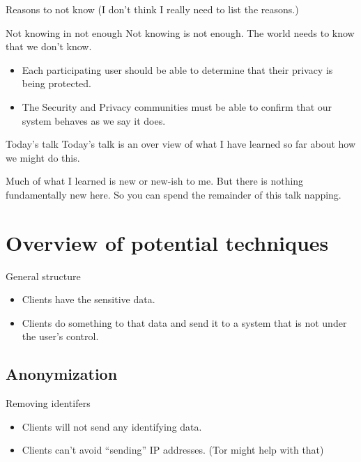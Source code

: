\documentclass[xcolor={dvipsnames,table,hyperref}]{beamer}
\begin{document}
\begin{frame}{Reasons to not know}
  (I don't think I really need to list the reasons.)
\end{frame}

\begin{frame}{Not knowing in not enough}
  Not knowing is not enough. The world needs to know that we don't know.
  \begin{itemize}
    \item Each participating user should be able to determine that their privacy is being protected.
    \item The Security and Privacy communities must be able to confirm that our system behaves as we say it does.
  \end{itemize}

\end{frame}

\begin{frame}{Today's talk}
  Today's talk is an over view of what I have learned so far about how we might do this.

  Much of what I learned is new or new-ish to me. But there is nothing fundamentally new here. So you can spend the remainder of this talk napping.

\end{frame}

\section{Overview of potential techniques}

\begin{frame}{General structure}
  \begin{itemize}
    \item Clients have the sensitive data.
    \item Clients do something to that data and send it to a system that is not under the user's control.
  \end{itemize}
\end{frame}

\subsection{Anonymization}

\begin{frame}{Removing identifers}
  \begin{itemize}
    \item Clients will not send any identifying data.
    \item Clients can't avoid “sending” IP addresses. (Tor might help with that)
  \end{itemize}
\end{frame}
\end{document}
